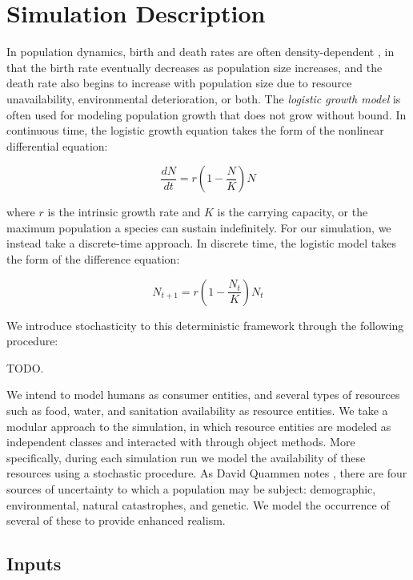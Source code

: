 \documentclass[12pt]{article}
\begin{document}
\section{Simulation Description}
\label{sec:simdescrip}

In population dynamics, birth and death rates are often density-dependent
\cite{guckenheimer1977dynamics}, in that the birth rate eventually decreases as
population size increases, and the death rate also begins to increase with
population size due to resource unavailability, environmental deterioration, or
both. The \textit{logistic growth model} is often used for modeling population
growth that does not grow without bound. In continuous time, the logistic growth
equation takes the form of the nonlinear differential equation:

\begin{equation}
  \frac{dN}{dt} = r\left(1-\frac{N}{K}\right)N
\end{equation}

where $r$ is the intrinsic growth rate and $K$ is the carrying capacity, or the
maximum population a species can sustain indefinitely. For our simulation, we
instead take a discrete-time approach. In discrete time, the logistic model
takes the form of the difference equation:

\begin{equation}
  \label{eq:logisticdiff}
  N_{t+1} = r\left(1-\frac{N_t}{K}\right)N_t
\end{equation}

We introduce stochasticity to this deterministic framework through the following
procedure:

TODO.

We intend to model humans as consumer entities, and several types of resources
such as food, water, and sanitation availability as resource entities. We take
a modular approach to the simulation, in which resource entities are modeled as
independent classes and interacted with through object methods. More
specifically, during each simulation run we model the availability of these
resources using a stochastic procedure. As David Quammen notes
\cite{quammen1996song}, there are four sources of uncertainty to which a
population may be subject: demographic, environmental, natural catastrophes, and
genetic. We model the occurrence of several of these to provide enhanced
realism.

\subsection{Inputs}
\end{document}
